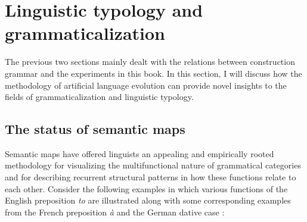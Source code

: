 \section{Linguistic typology and grammaticalization}
\label{s:comp-semmaps}

The previous two sections mainly dealt with the relations between construction grammar and the experiments in this book. In this section, I will discuss how the methodology of artificial language evolution can provide novel insights to the fields of grammaticalization and linguistic typology.

\subsection{The status of semantic maps}
\label{s:semantic-maps}

Semantic maps have offered linguists an appealing and empirically rooted methodology for visualizing the multifunctional nature of grammatical categories and for describing recurrent structural patterns in how these functions relate to each other. Consider the following examples in which various functions of the English preposition {\em to} are illustrated along with some corresponding examples from the French preposition {\em \`{a}} and the German dative case \citep[taken from][example 2, p. 212 and example sentences on p. 213--215]{haspelmath03geometry}:

